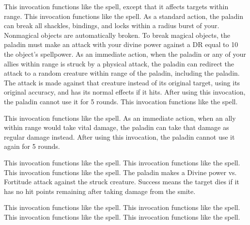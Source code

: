          This invocation functions like the  spell, except that it affects targets within \rngmed range.
         This invocation functions like the  spell.
        As a standard action, the paladin can break all shackles, bindings, and locks within a \arealarge radius burst of your.
        Nonmagical objects are automatically broken.
        To break magical objects, the paladin must make an attack with your divine power against a DR equal to 10 \add the object's spellpower.
        As an immediate action, when the paladin or any of your allies within \rngclose range is struck by a physical attack, the paladin can redirect the attack to a random creature within \rngclose range of the paladin, including the paladin.
        The attack is made against that creature instead of its original target, using its original accuracy, and has its normal effects if it hits.
        After using this invocation, the paladin cannot use it for 5 rounds.
         This invocation functions like the  spell.

        This invocation functions like the  spell.
        As an immediate action, when an ally within \rngmed range would take vital damage, the paladin can take that damage as regular damage instead.
        After using this invocation, the paladin cannot use it again for 5 rounds.

         This invocation functions like the  spell.
         This invocation functions like the  spell.
         This invocation functions like the  spell.
        The paladin makes a Divine power vs. Fortitude attack against the struck creature.
        Success means the target dies if it has no hit points remaining after taking damage from the smite.

         This invocation functions like the  spell.
         This invocation functions like the  spell.
         This invocation functions like the  spell.
         This invocation functions like the  spell.


